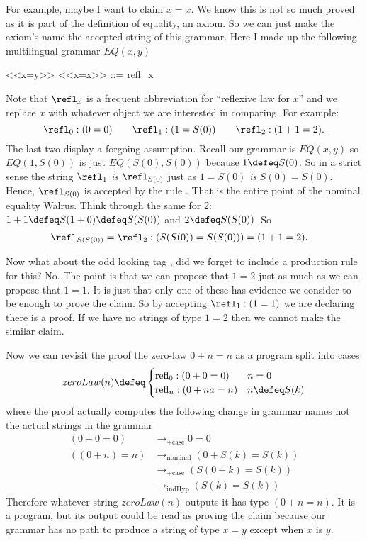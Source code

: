 For example, maybe I want to claim $x=x$.  We know 
this is not so much proved as it is part of the definition of equality, 
an axiom.  So we can just make the axiom's name the accepted 
string of this grammar.  Here I made up the following 
multilingual grammar $EQ(x,y)$
\begin{center}
\begin{Gcode}
<<x=y>>
<<x=x>> ::= refl_x
\end{Gcode}
\end{center}
Note that $\refl_x$ is a frequent abbreviation for ``reflexive law for $x$''
and we replace $x$ with whatever object we are interested in comparing.
For example:
\[
    \refl_0:(0=0)\qquad \refl_{1}:(1=S(0))
    \qquad \refl_{2}:(1+1=2).
\]
The last two display a forgoing assumption.
Recall our grammar is $EQ(x,y)$ so $EQ(1,S(0))$ is just $EQ(S(0),S(0))$ 
because $1\defeq S(0)$.  So in a strict sense
the string $\refl_1$ \emph{is} $\refl_{S(0)}$ just as $1=S(0)$ \emph{is}
$S(0)=S(0)$. Hence, $\refl_{S(0)}$ is accepted by the 
rule .  That is the entire point of the 
nominal equality Walrus.  Think through the same for $2$:
$1+1\defeq S(1+0)\defeq S(S(0))$ and $2\defeq S(S(0))$.  So 
\begin{align*}
    \refl_{S(S(0))} =\refl_2 & : (S(S(0))=S(S(0))) = (1+1=2).
\end{align*}


Now what about the odd looking tag , did we forget 
to include a production rule for this?  No.  The point is that 
we can propose that $1=2$ just as much as we can propose that $1=1$.
It is just that only one of these has evidence we consider to be 
enough to prove the claim.  So by accepting $\refl_1:(1=1)$ we 
are declaring there is a proof.  If we have no strings of type $1=2$ 
then we cannot make the similar claim.

Now we can revisit the proof the zero-law $0+n=n$ as a program 
split into cases
\[
    zeroLaw(n) \defeq \begin{cases}
        \text{refl}_0:(0+0=0) & n=0\\
        \text{refl}_n:(0+na=n) & n\defeq S(k)
    \end{cases}
\]
where the proof actually computes the following change in grammar names
not the actual strings in the grammar
\begin{align*}
    (0+0=0) & \longrightarrow_{+\text{case}} 0=0\\
    ((0+n)=n) & \longrightarrow_{\text{nominal}}  (0+S(k)=S(k))\\
     & \longrightarrow_{+\text{case}} (S(0+k)=S(k))\\
     & \longrightarrow_{\text{indHyp}} (S(k)=S(k))
\end{align*}
Therefore whatever string $zeroLaw(n)$ outputs it has type $(0+n=n)$.
It is a program, but its output could be read as proving the claim because 
our grammar has no path to produce a string of type $x=y$ except when $x$ is $y$.


